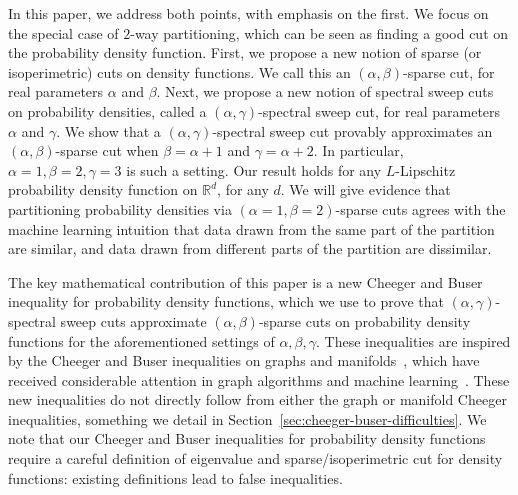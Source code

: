In this paper, we address both points, with emphasis on the first.  We
focus on the special case of $2$-way partitioning, which can be seen as
finding a good cut on the probability density function. First, we
propose a new notion of sparse (or isoperimetric)
cuts on density functions. We call this an $(\alpha, \beta)$-sparse cut,
for real parameters $\alpha$ and $\beta$. Next, we propose a new notion of spectral
sweep cuts on probability densities, called a $(\alpha,
\gamma)$-spectral sweep cut, for real parameters $\alpha$ and $\gamma$.
We show that a $(\alpha, \gamma)$-spectral sweep cut provably
approximates an $(\alpha, \beta)$-sparse cut when
$\beta = \alpha+1$ and $\gamma=\alpha+2$. In particular, $\alpha = 1, \beta = 2,
\gamma=3$ is such a setting.
Our result holds for any $L$-Lipschitz
probability density function on $\mathbb{R}^d$, for any $d$. 
We will give evidence that partitioning probability densities via
$(\alpha=1, \beta=2)$-sparse cuts agrees with the machine learning
intuition that data drawn from the same part of the partition are
similar, and data drawn from different parts of the partition are
dissimilar.  

The key mathematical contribution of this paper is a new Cheeger and Buser
inequality for probability density functions, which we use to prove
that $(\alpha,\gamma)$-spectral sweep cuts approximate $(\alpha,
\beta)$-sparse cuts on probability
density functions for the aforementioned settings of $\alpha, \beta, \gamma$.
These inequalities
are inspired by the Cheeger and Buser inequalities on graphs and
manifolds~\cite{AlonM84, Cheeger70, Buser82}, which have received
considerable attention in graph algorithms and machine
learning~\cite{ChungBook97, SpielmanTeng2004, Orecchia08, Orecchia2011,
kw16, belkin2004semisup}. These new inequalities do not directly follow
from either the graph or manifold Cheeger inequalities,
something we detail in Section~\ref{sec:cheeger-buser-difficulties}.
We note that our Cheeger and Buser inequalities for probability density
functions require a careful definition of eigenvalue and
sparse/isoperimetric cut for density functions: existing definitions
lead to false inequalities. 

